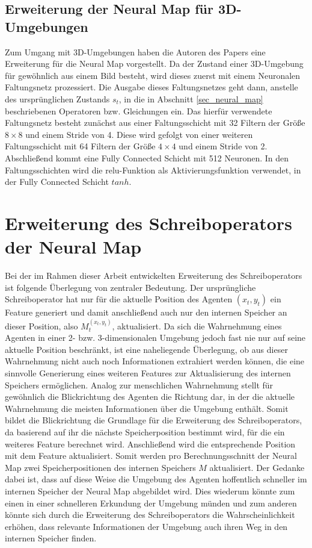 \subsection{Erweiterung der Neural Map für 3D-Umgebungen}
\label{sec_nm_3d_ext}

Zum Umgang mit 3D-Umgebungen haben die Autoren des Papers eine Erweiterung für die Neural Map vorgestellt. Da der Zustand einer 3D-Umgebung für gewöhnlich aus einem Bild besteht, wird dieses zuerst mit einem Neuronalen Faltungsnetz prozessiert. Die Ausgabe dieses Faltungsnetzes geht dann, anstelle des ursprünglichen Zustands $s_t$, in die in Abschnitt \ref{sec_neural_map} beschriebenen Operatoren bzw. Gleichungen ein. Das hierfür verwendete Faltungsnetz besteht zunächst aus einer Faltungsschicht mit 32 Filtern der Größe $8 \times 8$ und einem Stride von 4. Diese wird gefolgt von einer weiteren Faltungsschicht mit 64 Filtern der Größe $4 \times 4$ und einem Stride von 2. Abschließend kommt eine Fully Connected Schicht mit 512 Neuronen. In den Faltungsschichten wird die relu-Funktion als Aktivierungsfunktion verwendet, in der Fully Connected Schicht $tanh$.


\section{Erweiterung des Schreiboperators der Neural Map}
\label{sec_write_ext}

Bei der im Rahmen dieser Arbeit entwickelten Erweiterung des Schreiboperators ist folgende Überlegung von zentraler Bedeutung. Der ursprüngliche Schreiboperator hat nur für die aktuelle Position des Agenten $(x_t,y_t)$ ein Feature generiert und damit anschließend auch nur den internen Speicher an dieser Position, also $M_t^{(x_t,y_t)}$, aktualisiert. Da sich die Wahrnehmung eines Agenten in einer 2- bzw. 3-dimensionalen Umgebung jedoch fast nie nur auf seine aktuelle Position beschränkt, ist eine naheliegende Überlegung, ob aus dieser Wahrnehmung nicht auch noch Informationen extrahiert werden können, die eine sinnvolle Generierung eines weiteren Features zur Aktualisierung des internen Speichers ermöglichen. Analog zur menschlichen Wahrnehmung stellt für gewöhnlich die Blickrichtung des Agenten die Richtung dar, in der die aktuelle Wahrnehmung die meisten Informationen über die Umgebung enthält. Somit bildet die Blickrichtung die Grundlage für die Erweiterung des Schreiboperators, da basierend auf ihr die nächste Speicherposition bestimmt wird, für die ein weiteres Feature berechnet wird. Anschließend wird die entsprechende Position mit dem Feature aktualisiert. Somit werden pro Berechnungsschnitt der Neural Map zwei Speicherpositionen des internen Speichers $M$ aktualisiert. Der Gedanke dabei ist, dass auf diese Weise die Umgebung des Agenten hoffentlich schneller im internen Speicher der Neural Map abgebildet wird. Dies wiederum könnte zum einen in einer schnelleren Erkundung der Umgebung münden und zum anderen könnte sich durch die Erweiterung des Schreiboperators die Wahrscheinlichkeit erhöhen, dass relevante Informationen der Umgebung auch ihren Weg in den internen Speicher finden.

